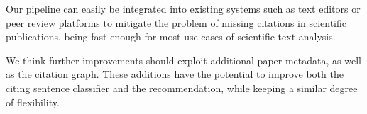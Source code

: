 \documentclass[12pt,a4paper]{report}
\begin{document}
Our pipeline can easily be integrated into existing systems such as text editors or peer review platforms to mitigate the problem of missing citations in scientific publications, being fast enough for most use cases of scientific text analysis.

We think further improvements should exploit additional paper metadata, as well as the citation graph. These additions have the potential to improve both the citing sentence classifier and the recommendation, while keeping a similar degree of flexibility.

\end{document}
